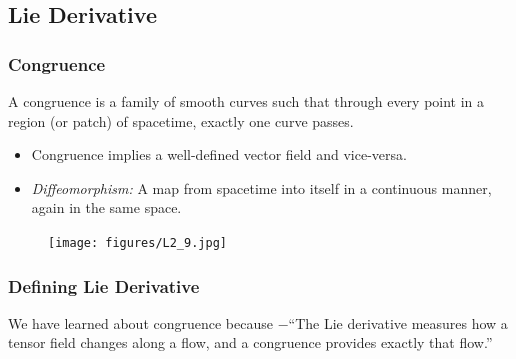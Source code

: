 \documentclass[14pt]{article} %
\begin{document}
\subsection{Lie Derivative}

\subsubsection{Congruence}
A congruence is a family of smooth curves such that through every point in a region (or patch) of spacetime, exactly one curve passes.

\begin{itemize}
    \item Congruence implies a well-defined vector field and vice-versa.
    \item \textit{Diffeomorphism:} A map from spacetime into itself in a continuous manner, again in the same space.
\end{itemize}
\vspace{-0.5cm}
\begin{figure}[H]
\centering
\texttt{[image: figures/L2\_9.jpg]}
\caption*{}
\end{figure}
\vspace{-1cm}
\noindent 
\subsubsection*{Defining Lie Derivative}
We have learned about congruence because $-$``The Lie derivative measures how a tensor field changes along a flow, and a congruence provides exactly that flow.''
\end{document}
